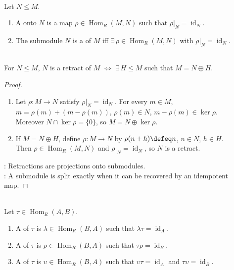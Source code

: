 \begin{definition} \label{def:module-retract} \\
Let $N\leq M$.
\begin{enumerate}[label=(\roman*)]
\setlength{\itemsep}{0pt}
\item A  onto $N$ is a map $\rho\in\operatorname{Hom}_R(M,N)$ such that $\rho|_N=\operatorname{id}_N$.
\item The submodule $N$ is a  of $M$ iff $\exists\,\rho\in\operatorname{Hom}_R(M,N)$ with $\rho|_N=\operatorname{id}_N$.
\end{enumerate}
\end{definition}

\begin{corollary} \label{cor:retract-iff-direct-summand-module} \\
For $N\leq M$, $N$ is a retract of $M$ $\Longleftrightarrow$ $\exists\,H\leq M$ such that $M=N\oplus H$.
\begin{proof}
\begin{enumerate}[label=\roman*.]
\setlength{\itemsep}{0pt}
\item[$(\Rightarrow)$] Let $\rho:M\to N$ satisfy $\rho|_N=\operatorname{id}_N$. For every $m\in M$, $m=\rho(m)+(m-\rho(m))$, $\rho(m)\in N$, $m-\rho(m)\in\ker\rho$.\\
Moreover $N\cap\ker\rho=\{0\}$, so $M=N\oplus\ker\rho$.
\item[$(\Leftarrow)$] If $M=N\oplus H$, define $\rho:M\to N$ by $\rho(n+h)\defeq n$, $n\in N$, $h\in H$.\\
Then $\rho\in\operatorname{Hom}_R(M,N)$ and $\rho|_N=\operatorname{id}_N$, so $N$ is a retract.
\end{enumerate}
: Retractions are projections onto submodules.\\
: A submodule is split exactly when it can be recovered by an idempotent map.
\end{proof}
\end{corollary}

\begin{definition} \label{def:one-sided-inverses-module-maps} \\
Let $\tau\in\operatorname{Hom}_R(A,B)$.
\begin{enumerate}[label=(\roman*)]
\setlength{\itemsep}{0pt}
\item A  of $\tau$ is $\lambda\in\operatorname{Hom}_R(B,A)$ such that $\lambda\tau=\operatorname{id}_A$.
\item A  of $\tau$ is $\rho\in\operatorname{Hom}_R(B,A)$ such that $\tau\rho=\operatorname{id}_B$.
\item A  of $\tau$ is $\upsilon\in\operatorname{Hom}_R(B,A)$ such that $\upsilon\tau=\operatorname{id}_A$ and $\tau\upsilon=\operatorname{id}_B$.
\end{enumerate}
\end{definition}

